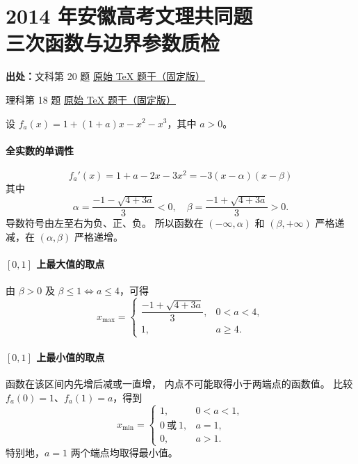 \documentclass[UTF8,a4paper,11pt]{ctexart}
\begin{document}
\clearpage
{}
{}
\section*{2014 年安徽高考文理共同题\\三次函数与边界参数质检}
\noindent\textbf{出处：}文科第 20 题 \href{https://github.com/DxAThing/Gaokao-Math-Problems-Compilation/blob/f1ae169b58a75b3db6e35c670b3f0d5c78718188/content/2014/anhui_liberal.tex#L628}{原始 TeX 题干（固定版）}

理科第 18 题 \href{https://github.com/DxAThing/Gaokao-Math-Problems-Compilation/blob/f1ae169b58a75b3db6e35c670b3f0d5c78718188/content/2014/anhui_science.tex#L279}{原始 TeX 题干（固定版）}

设 $f_a(x)=1+(1+a)x-x^2-x^3$，其中 $a>0$。
\paragraph{全实数的单调性}
\[
 f_a'(x)=1+a-2x-3x^2=-3(x-\alpha)(x-\beta)
\]
其中
\[
 \alpha=\frac{-1-\sqrt{4+3a}}3<0,\quad
 \beta=\frac{-1+\sqrt{4+3a}}3>0.
\]
导数符号由左至右为负、正、负。
所以函数在 $(-\infty,\alpha)$ 和
$(\beta,+\infty)$ 严格递减，在 $(\alpha,\beta)$ 严格递增。

\paragraph{$[0,1]$ 上最大值的取点}
由 $\beta>0$ 及
$\beta\le1\Longleftrightarrow a\le4$，可得
\[
 x_{\max}=
 \begin{cases}
  \dfrac{-1+\sqrt{4+3a}}3,&0<a<4,\\[2mm]
  1,&a\ge4.
 \end{cases}
\]

\paragraph{$[0,1]$ 上最小值的取点}
函数在该区间内先增后减或一直增，
内点不可能取得小于两端点的函数值。
比较 $f_a(0)=1$、$f_a(1)=a$，得到
\[
 x_{\min}=
 \begin{cases}
  1,&0<a<1,\\
  0\ \text{或}\ 1,&a=1,\\
  0,&a>1.
 \end{cases}
\]
特别地，$a=1$ 两个端点均取得最小值。
\end{document}
